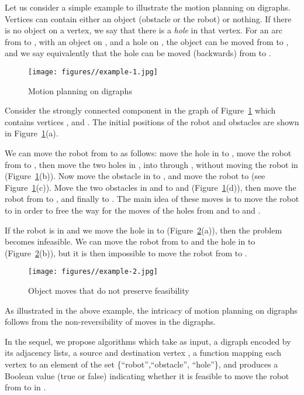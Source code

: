 \documentclass{article}
\begin{document}
Let us consider a simple example to illustrate the motion planning
on digraphs. Vertices can contain either an object (obstacle or the
robot) or nothing. If there is no object on a vertex, we say that
there is a \emph{hole} in that vertex. For an arc  from 
to , with an object on , and a hole on , the object can be
moved from  to , and we say equivalently that the hole can be
moved (backwards) from  to .

\begin{figure}[ht]
\centering
\texttt{[image: figures//example-1.jpg]}
\caption{Motion planning on digraphs}\label{fig:example-1}
\end{figure}


Consider the strongly connected component   in the graph of
Figure~\ref{fig:example-1} which contains vertices ,
 and . The initial positions of the robot and obstacles are
shown in Figure~\ref{fig:example-1}(a).

We can move the robot from  to  as follows: move the hole in
 to , move the robot from  to , then move the two
holes in ,  into  through , without moving the
robot in  (Figure~\ref{fig:example-1}(b)). Now move the
obstacle in  to , and move the robot to  (see
Figure~\ref{fig:example-1}(c)). Move the two obstacles in  and
 to  and  (Figure~\ref{fig:example-1}(d)), then move the
robot from  to , and finally to . The main idea of
these moves is to move the robot to  in order to free the way
for the moves of the holes from  and   to  and .

If the robot is in  and we move the hole in  to 
(Figure~\ref{fig:example-2}(a)), then the problem becomes
infeasible. We can move the robot from  to  and the hole in
 to  (Figure~\ref{fig:example-2}(b)), but it is then
impossible to move the robot from  to .

\begin{figure}[ht]
\centering
\texttt{[image: figures//example-2.jpg]}
\caption{Object moves that do not preserve feasibility}\label{fig:example-2}
\end{figure}

As illustrated in the above example, the intricacy of motion
planning on digraphs follows from the non-reversibility of moves in
the digraphs.

In the sequel, we propose algorithms which take as input, a digraph
 encoded by its adjacency lists, a source and destination
vertex , a function  mapping each vertex to an element
of the set \{``robot'',``obstacle'', ``hole''\}, and produces a
Boolean value (true or false) indicating whether it is feasible to
move the robot from  to  in .
\end{document}
